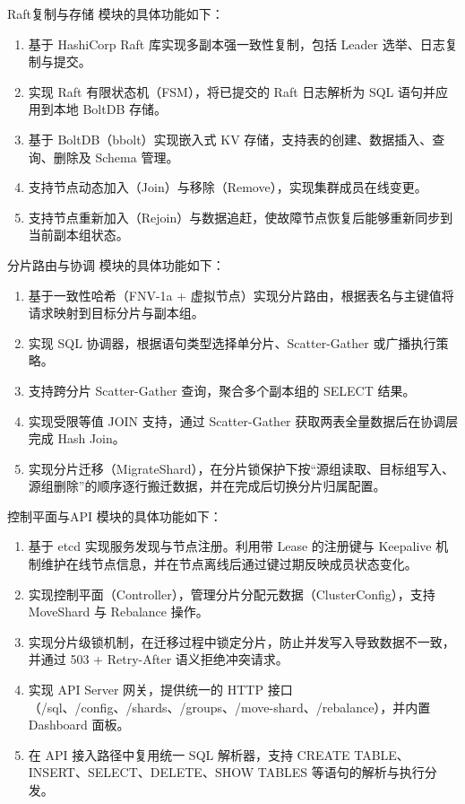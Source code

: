 \documentclass[UTF8,a4paper,12pt]{ctexart}
\newcommand{\moduleA}{Raft复制与存储}
\newcommand{\moduleB}{分片路由与协调}
\newcommand{\moduleC}{控制平面与API}
\begin{document}
\moduleA{} 模块的具体功能如下：
\begin{enumerate}
  \item 基于 HashiCorp Raft 库\cite{hashicorp}实现多副本强一致性复制，包括 Leader 选举、日志复制与提交。
  \item 实现 Raft 有限状态机（FSM），将已提交的 Raft 日志解析为 SQL 语句并应用到本地 BoltDB 存储。
  \item 基于 BoltDB（bbolt）实现嵌入式 KV 存储，支持表的创建、数据插入、查询、删除及 Schema 管理。
  \item 支持节点动态加入（Join）与移除（Remove），实现集群成员在线变更。
  \item 支持节点重新加入（Rejoin）与数据追赶，使故障节点恢复后能够重新同步到当前副本组状态。
\end{enumerate}

\moduleB{} 模块的具体功能如下：
\begin{enumerate}
  \item 基于一致性哈希（FNV-1a + 虚拟节点）实现分片路由，根据表名与主键值将请求映射到目标分片与副本组。
  \item 实现 SQL 协调器，根据语句类型选择单分片、Scatter-Gather 或广播执行策略。
  \item 支持跨分片 Scatter-Gather 查询，聚合多个副本组的 SELECT 结果。
  \item 实现受限等值 JOIN 支持，通过 Scatter-Gather 获取两表全量数据后在协调层完成 Hash Join。
  \item 实现分片迁移（MigrateShard），在分片锁保护下按“源组读取、目标组写入、源组删除”的顺序逐行搬迁数据，并在完成后切换分片归属配置。
\end{enumerate}

\moduleC{} 模块的具体功能如下：
\begin{enumerate}
  \item 基于 etcd\cite{etcd} 实现服务发现与节点注册。利用带 Lease 的注册键与 Keepalive 机制维护在线节点信息，并在节点离线后通过键过期反映成员状态变化。
  \item 实现控制平面（Controller），管理分片分配元数据（ClusterConfig），支持 MoveShard 与 Rebalance 操作。
  \item 实现分片级锁机制，在迁移过程中锁定分片，防止并发写入导致数据不一致，并通过 503 + Retry-After 语义拒绝冲突请求。
  \item 实现 API Server 网关，提供统一的 HTTP 接口（/sql、/config、/shards、/groups、/move-shard、/rebalance），并内置 Dashboard 面板。
  \item 在 API 接入路径中复用统一 SQL 解析器，支持 CREATE TABLE、INSERT、SELECT、DELETE、SHOW TABLES 等语句的解析与执行分发。
\end{enumerate}
\end{document}
